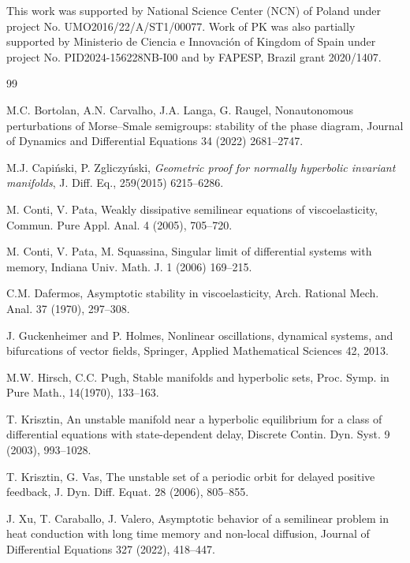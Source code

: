 \documentclass[11pt, leqno]{amsart}
\theoremstyle{definition}
\begin{document}
This work was supported by National Science Center (NCN) of Poland under project No. UMO2016/22/A/ST1/00077. Work of PK was also partially supported by Ministerio de Ciencia e Innovaci\'{o}n of Kingdom of Spain under project No. PID2024-156228NB-I00 and by	FAPESP, Brazil grant 2020/1407.
\begin{thebibliography}{99}
	
	
	 M.C. Bortolan, A.N. Carvalho, J.A. Langa, G. Raugel, Nonautonomous perturbations of Morse--Smale semigroups: stability of the phase diagram, Journal of Dynamics and Differential Equations 34 (2022) 2681–2747.
	
	
		 M.J. Capi\'nski, P. Zgliczy\'nski, \emph{Geometric proof for normally hyperbolic invariant manifolds},  J. Diff. Eq., 259(2015) 6215--6286.
		
	 M. Conti, V. Pata,
Weakly dissipative semilinear equations of viscoelasticity, Commun. Pure Appl.
Anal. 4 (2005), 705–720.
	
		 M. Conti, V. Pata, M. Squassina, Singular limit of differential systems with memory, Indiana Univ. Math. J. 1 (2006)
	169--215.
	
	 C.M. Dafermos, Asymptotic stability in viscoelasticity, Arch. Rational Mech. Anal. 37 (1970), 297--308.
	
	 J. Guckenheimer and P. Holmes, Nonlinear oscillations, dynamical systems, and bifurcations of vector fields, Springer, Applied Mathematical Sciences 42, 2013.
	
		 M.W. Hirsch, C.C. Pugh, Stable manifolds and hyperbolic sets, Proc. Symp. in Pure Math.,
	14(1970), 133--163.
	
	  T. Krisztin, An unstable manifold near a hyperbolic equilibrium for a class of differential equations
	with state-dependent delay, Discrete Contin. Dyn. Syst. 9 (2003), 993--1028.
	
	 T. Krisztin, G. Vas,  The unstable set of a periodic orbit for delayed positive feedback, J. Dyn. Diff. Equat. 28 (2006), 805--855.
	
		 J. Xu, T. Caraballo, J. Valero,
		Asymptotic behavior of a semilinear problem in heat conduction with long time memory and non-local diffusion, Journal of Differential Equations 327 (2022), 418--447.


\end{thebibliography}
\end{document}
